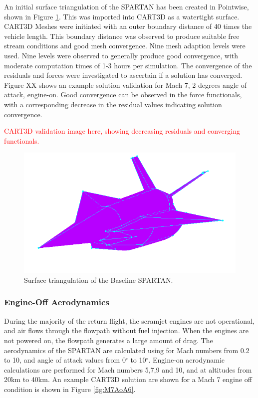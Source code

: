 		An initial surface triangulation of the SPARTAN has been created in Pointwise, shown in Figure \ref{fig:Pointwise}. This was imported into CART3D as a watertight surface. 
		CART3D Meshes were initiated with an outer boundary distance of 40 times the vehicle length. This boundary distance was observed to produce suitable free stream conditions and good mesh convergence. Nine mesh adaption levels were used. Nine levels were observed to generally produce good convergence, with moderate computation times of 1-3 hours per simulation. The convergence of the residuals and forces were investigated to ascertain if a solution has converged. Figure XX shows an example solution validation for Mach 7, 2 degrees angle of attack, engine-on. Good convergence can be observed in the force functionals, with a corresponding decrease in the residual values indicating solution convergence.  
		
		
		\textcolor{red}{CART3D validation image here, showing decreasing residuals and converging functionals.}
		
		
		
	
		
		
		
		\begin{figure}[ht]
			\centering
			\includegraphics[width=0.6\linewidth]{figures/3_vehicle_design/Pointwise}
			\caption{Surface triangulation of the Baseline SPARTAN.}
			\label{fig:Pointwise}
		\end{figure}
		
		\subsubsection{Engine-Off Aerodynamics}
		
		During the majority of the return flight, the scramjet engines are not operational, and air flows through the flowpath without fuel injection. When the engines are not powered on, the flowpath generates a large amount of drag. 
		The aerodynamics of the SPARTAN are calculated using for Mach numbers from 0.2 to 10, and angle of attack values from 0$^\circ$ to 10$^\circ$. Engine-on aerodynamic calculations are performed for Mach numbers 5,7,9 and 10, and at altitudes from 20km to 40km. An example CART3D solution are shown for a Mach 7 engine off condition is shown in Figure  \ref{fig:M7AoA6}. 
		
